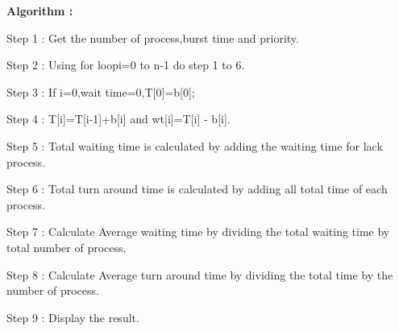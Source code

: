 \documentclass[journal,onecolumn]{IEEEtran}
\begin{document}
\textbf{Algorithm : }
\begin{list}{}{}
  \item Step 1 : Get the number of process,burst time and priority.
  \item Step 2 : Using for loopi=0 to n-1 do step 1 to 6.
  \item Step 3 : If i=0,wait time=0,T[0]=b[0];
  \item Step 4 : T[i]=T[i-1]+b[i] and wt[i]=T[i] - b[i].
  \item Step 5 : Total waiting time is calculated by adding the waiting time for lack
        process.
  \item Step 6 : Total turn around time is calculated by adding all
        total time of each process.
  \item Step 7 : Calculate Average waiting time by dividing the total waiting time by total
        number of process.
  \item Step 8 : Calculate Average turn around time by dividing the total time by the
        number of process.
  \item Step 9 :  Display the result.
\end{list}
\end{document}
